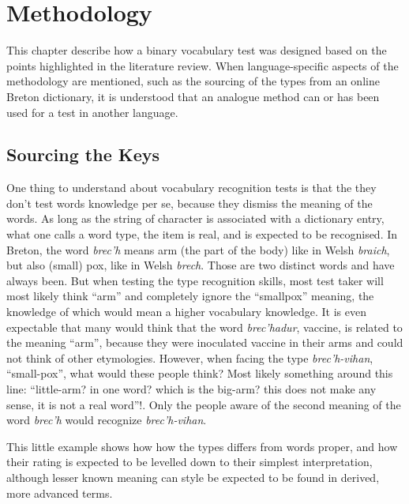 \chapter{Methodology}

This chapter describe how a binary vocabulary test was designed based on the points highlighted in the literature review. When language-specific aspects of the methodology are mentioned, such as the sourcing of the types from an online Breton dictionary, it is understood that an analogue method can or has been used for a test in another language. 

\section{Sourcing the Keys}
One thing to understand about vocabulary recognition tests is that the they don't test words knowledge per se, because they dismiss the meaning of the words. As long as the string of character is associated with a dictionary entry, what one calls a word type, the item is real, and is expected to be recognised. In Breton, the word \textit{brec'h} means arm (the part of the body) like in Welsh \textit{braich}, but also (small) pox, like in Welsh \textit{brech}. Those are two distinct words and have always been. But when testing the type recognition skills, most test taker will most likely think ``arm'' and completely ignore the ``smallpox'' meaning, the knowledge of which would mean a higher vocabulary knowledge. It is even expectable that many would think that the word \textit{brec'hadur}, vaccine, is related to the meaning ``arm'', because they were inoculated vaccine in their arms and could not think of other etymologies. However, when facing the type \textit{brec'h-vihan}, ``small-pox'', what would these people think? Most likely something around this line: ``little-arm? in one word? which is the big-arm? this does not make any sense, it is not a real word''!. Only the people aware of the second meaning of the word \textit{brec'h} would recognize \textit{brec'h-vihan}.

This little example shows how how the types differs from words proper, and how their rating is expected to be levelled down to their simplest interpretation, although lesser known meaning can style be expected to be found in derived, more advanced terms.

